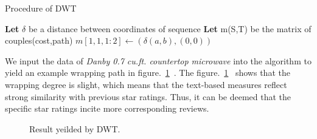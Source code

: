 \documentclass[12pt]{article}%
\begin{document}
\begin{algorithm}[H]
	\caption{Procedure of DWT}  
	\LinesNumbered  
	\textbf{Let} $\delta$ be a distance between coordinates of sequence \newline
    \textbf{Let} m(S,T) be the matrix of couples(cost,path)\newline
   $ m[1,1,1:2]\leftarrow(\delta(a,b),(0,0)) $\newline
\end{algorithm} 
We input the data of \textit{Danby 0.7 cu.ft. countertop microwave} into the algorithm to yield an example wrapping  path in figure.~\ref{FFFF}~. The figure.~\ref{FFFF}~ shows that the wrapping  degree is slight, which means that the text-based measures reflect strong similarity with previous star ratings. Thus, it can be deemed that the specific star ratings incite more corresponding reviews.
\begin{figure}[H]
	\centering
	\caption{ Result yeilded by DWT.}
	\label{FFFF}
\end{figure}
\end{document}
